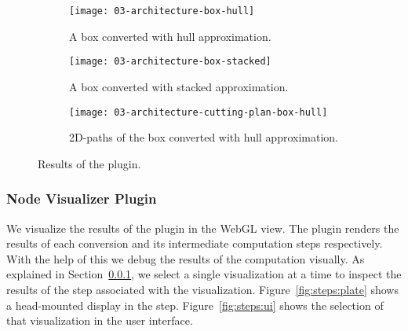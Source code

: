 \documentclass[../03-Architecture.tex]{subfiles}
\begin{document}
\begin{figure}[h]
  \centering
  \begin{subfigure}[a]{0.3222\textwidth}
    \texttt{[image: 03-architecture-box-hull]}
    \caption{A box converted with hull approximation.}
    \label{fig:conversion:plate}
  \end{subfigure}
  \begin{subfigure}[b]{0.3222\textwidth}
    \texttt{[image: 03-architecture-box-stacked]}
    \caption{A box converted with stacked approximation.}
    \label{fig:conversion:stacked}
  \end{subfigure}
  \begin{subfigure}[c]{0.3222\textwidth}
    \texttt{[image: 03-architecture-cutting-plan-box-hull]}
    \caption{2D-paths of the box converted with hull approximation.}
    \label{fig:conversion:paths}
  \end{subfigure}
  \caption{Results of the  plugin.}
  \label{fig:conversion}
\end{figure}


\subsubsection{Node Visualizer Plugin}

We visualize the results of the 
plugin in the WebGL view. The  plugin
renders the results of each conversion and its intermediate
computation steps respectively. With the help of this we
debug the results of the computation visually. As explained
in Section~\ref{}, we select a
single visualization at a time to inspect the results of the
step associated with the visualization.
Figure~\ref{fig:steps:plate} shows a head-mounted display in
the  step. Figure~\ref{fig:steps:ui} shows the
selection of that visualization in the user interface.
\end{document}
